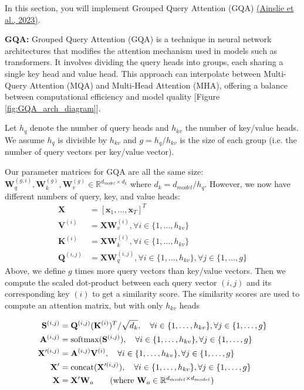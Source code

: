 \documentclass[11pt,addpoints,answers]{exam}
\newcommand{\Rb}{\mathbb{R}}
\newcommand{\xv}{\mathbf{x}}
\newcommand{\Av}{\mathbf{A}}
\newcommand{\Kv}{\mathbf{K}}
\newcommand{\Qv}{\mathbf{Q}}
\newcommand{\Sv}{\mathbf{S}}
\newcommand{\Vv}{\mathbf{V}}
\newcommand{\Wv}{\mathbf{W}}
\newcommand{\Xv}{\mathbf{X}}
\begin{document}
\begin{questions}
\begin{parts}
    In this section, you will implement Grouped Query Attention (GQA) 
    \href{https://arxiv.org/pdf/2305.13245.pdf}{(Ainslie et al., 2023)}.
    
    \textbf{GQA:} Grouped Query Attention (GQA) is a technique in neural network architectures that modifies the attention mechanism used in models such as transformers. It involves dividing the query heads into groups, each sharing a single key head and value head. This approach can interpolate between Multi-Query Attention (MQA) and Multi-Head Attention (MHA), offering a balance between computational efficiency and model quality [Figure \ref{fig:GQA_arch_diagram}].

    Let $h_q$ denote the number of query heads and $h_{kv}$ the number of key/value heads. We assume $h_q$ is divisible by $h_{kv}$ and $g = h_q / h_{kv}$ is the size of each group (i.e. the number of query vectors per key/value vector).

    Our parameter matrices for GQA are all the same size: $\Wv_q^{(g,i)},\Wv_k^{(g)},\Wv_v^{(g)} \in \Rb^{d_{model} \times d_k}$  where $d_k = d_{model}/h_q$. However, we now have different numbers of query, key, and value heads:
    \begin{align*}
        \Xv &= [\xv_1, \ldots, \xv_T]^T  \\
        \Vv^{(i)} &= \Xv \Wv_v^{(i)}, \forall i \in \{1, \ldots, h_{kv} \} \\
        \Kv^{(i)} &= \Xv \Wv_k^{(i)}, \forall i \in \{1, \ldots, h_{kv} \} \\
        \Qv^{(i,j)} &= \Xv \Wv_q^{(i,j)}, \forall i \in \{1, \ldots, h_{kv} \}, \forall j \in \{1, \ldots, g \} 
    \end{align*}
    Above, we define $g$ times more query vectors than key/value vectors. 
    Then we compute the scaled dot-product between each query vector $(i,j)$ and its corresponding key $(i)$ to get a similarity score. 
    The similarity scores are used to compute an attention matrix, but with only $h_{kv}$ heads
    
    \begin{align*}
        \Sv^{(i,j)} &= \Qv^{(i,j)} (\Kv^{(i)})^T / \sqrt{d_k},  \quad \forall i \in \{1, \ldots, h_{kv} \}, \forall j \in \{1, \ldots, g\} \\
        \Av^{(i,j)} &= \text{softmax}(\Sv^{(i,j)}), \quad \forall i \in \{1, \ldots, h_{kv} \}, \forall j \in \{1, \ldots, g\} \\
        \Xv'^{(i,j)} &= \Av^{(i, j)} \Vv^{(i)}, \quad \forall i \in \{1, \ldots, h_{kv} \}, \forall j \in \{1, \ldots, g\} \\
        \Xv' &= \text{concat}(\Xv'^{(i,j)}), \quad  \forall i \in \{1, \ldots, h_{kv} \}, \forall j \in \{1, \ldots, g\} \\
        \Xv &= \Xv'\Wv_o \tag{where $\Wv_o \in \Rb^{d_{model} \times d_{model}}$}
    \end{align*}


\end{parts}
\end{questions}
\end{document}
